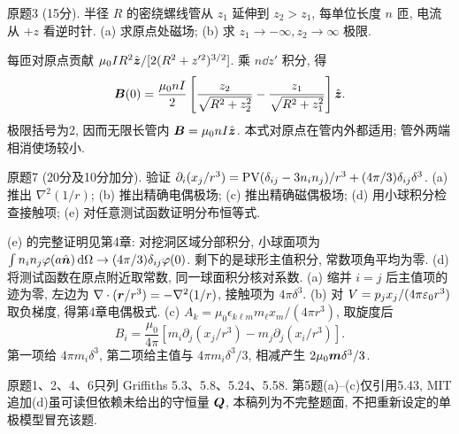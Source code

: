 \begin{exercise}
原题3 (15分). 半径 $R$ 的密绕螺线管从 $z_1$ 延伸到 $z_2>z_1$, 每单位长度 $n$ 匝, 电流从 $+z$ 看逆时针. (a) 求原点处磁场; (b) 求 $z_1\to-\infty,z_2\to\infty$ 极限.
\end{exercise}
\begin{solution}
每匝对原点贡献 $\mu_0IR^2\hat{\boldsymbol{z}}/[2(R^2+z'^2)^{3/2}]$. 乘 $n\dd z'$ 积分, 得
\[
\boldsymbol{B}(0)=\frac{\mu_0nI}2\left[\frac{z_2}{\sqrt{R^2+z_2^2}}-
\frac{z_1}{\sqrt{R^2+z_1^2}}\right]\hat{\boldsymbol{z}}.
\]
极限括号为2, 因而无限长管内 $\boldsymbol{B}=\mu_0nI\hat{\boldsymbol{z}}$. 本式对原点在管内外都适用; 管外两端相消使场较小.
\end{solution}
\begin{exercise}
原题7 (20分及10分加分). 验证 $\partial_i(x_j/r^3)=\operatorname{PV}(\delta_{ij}-3n_in_j)/r^3+(4\pi/3)\delta_{ij}\delta^3$. (a) 推出 $\nabla^2(1/r)$; (b) 推出精确电偶极场; (c) 推出精确磁偶极场; (d) 用小球积分检查接触项; (e) 对任意测试函数证明分布恒等式.
\end{exercise}
\begin{solution}
(e) 的完整证明见第4章: 对挖洞区域分部积分, 小球面项为 $\int n_in_j\varphi(a\hat{\boldsymbol{n}})\,\mathrm d\Omega\to(4\pi/3)\delta_{ij}\varphi(0)$. 剩下的是球形主值积分, 常数项角平均为零. (d) 将测试函数在原点附近取常数, 同一球面积分核对系数. (a) 缩并 $i=j$ 后主值项的迹为零, 左边为 $\nabla\cdot(\boldsymbol{r}/r^3)=-\nabla^2(1/r)$, 接触项为 $4\pi\delta^3$. (b) 对 $V=p_jx_j/(4\pi\varepsilon_0 r^3)$ 取负梯度, 得第4章电偶极式. (c) $A_k=\mu_0\epsilon_{k\ell m}m_\ell x_m/(4\pi r^3)$, 取旋度后
\[
B_i=\frac{\mu_0}{4\pi}\left[m_i\partial_j(x_j/r^3)-m_j\partial_j(x_i/r^3)\right].
\]
第一项给 $4\pi m_i\delta^3$, 第二项给主值与 $4\pi m_i\delta^3/3$, 相减产生 $2\mu_0\boldsymbol{m}\delta^3/3$.
\end{solution}
原题1、2、4、6只列 Griffiths 5.3、5.8、5.24、5.58. 第5题(a)--(c)仅引用5.43, MIT 追加(d)虽可读但依赖未给出的守恒量 $\boldsymbol{Q}$, 本稿列为不完整题面, 不把重新设定的单极模型冒充该题.

